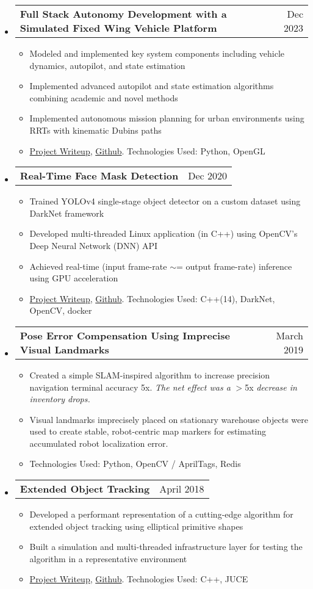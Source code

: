 \documentclass[letterpaper,18pt]{article}
\makeatletter
\newcommand{\resitem}[1]{\item #1 \vspace{-2pt}}
\newcommand{\headerrow}[2]{%
  \hspace*{-\labelsep}%
  \begin{tabular*}{\dimexpr\linewidth+\labelsep}{@{\extracolsep{\fill}}lr@{}}
    #1 &
    #2 \\
  \end{tabular*}%
}
\makeatother
\begin{document}
\begin{itemize}[label={},leftmargin=*,noitemsep]
\item
        \headerrow{\textbf{Full Stack Autonomy Development with a Simulated Fixed Wing Vehicle Platform}}{Dec 2023}
        {\small
	\begin{itemize}[noitemsep]
        \resitem{Modeled and implemented key system components including vehicle dynamics, autopilot, and state estimation}
        \resitem{Implemented advanced autopilot and state estimation algorithms combining academic and novel methods}
        \resitem{Implemented autonomous mission planning for urban environments using RRTs with kinematic Dubins paths}
        \resitem{\href{https://jwdinius.github.io/projects/uavbook/}{Project Writeup}, \href{https://github.com/jwdinius/uavbook/tree/jwd_solns}{Github}.  Technologies Used: Python, OpenGL}
	\end{itemize}
	}
\item
        \headerrow{\textbf{Real-Time Face Mask Detection}}{Dec 2020}
        {\small
	\begin{itemize}[noitemsep]
        \resitem{Trained YOLOv4 single-stage object detector on a custom dataset using DarkNet framework}
        \resitem{Developed multi-threaded Linux application (in C++) using OpenCV's Deep Neural Network (DNN) API}
        \resitem{Achieved real-time (input frame-rate $\sim$= output frame-rate) inference using GPU acceleration}
        \resitem{\href{https://jwdinius.github.io/projects/mask_detector/}{Project Writeup}, \href{https://github.com/jwdinius/yolov4-mask-detector}{Github}.  Technologies Used: C++(14), DarkNet, OpenCV, docker}
	\end{itemize}
	}
\item
	\headerrow{\textbf{Pose Error Compensation Using Imprecise Visual Landmarks}}{March 2019}
	{\small
	\begin{itemize}[noitemsep]
            \resitem{Created a simple SLAM-inspired algorithm to increase precision navigation terminal accuracy 5x.  \textit{The net effect was a} $>$5x \textit{decrease in inventory drops.}}
		\resitem{Visual landmarks imprecisely placed on stationary warehouse objects were used to create stable, robot-centric map markers for estimating accumulated robot localization error.}
		\resitem{Technologies Used: Python, OpenCV / AprilTags, Redis}
	\end{itemize}
	}
\item
	\headerrow{\textbf{Extended Object Tracking}}{April 2018}
	{\small
	\begin{itemize}[noitemsep]
		\resitem{Developed a performant representation of a cutting-edge algorithm for extended object tracking using elliptical primitive shapes}
		\resitem{Built a simulation and multi-threaded infrastructure layer for testing the algorithm in a representative environment}
		\resitem{\href{https://jwdinius.github.io/projects/eot/}{Project Writeup}, \href{https://github.com/jwdinius/extended-object-tracking}{Github}.  Technologies Used: C++, JUCE}
	\end{itemize}
	}
\end{itemize}
\end{document}
